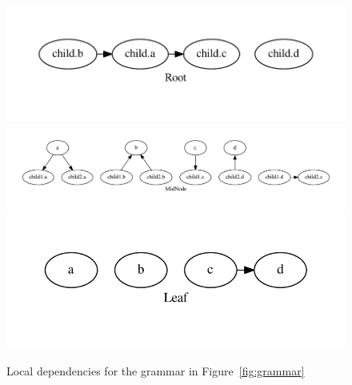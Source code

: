 \documentclass[10pt]{article}
\begin{document}
\begin{figure}[h]
    \begin{center}
        \includegraphics[scale=0.4]{root} \\
        \includegraphics[scale=0.4]{midnode} \\
        \includegraphics[scale=0.4]{leaf} \\
    \end{center}

    \caption{Local dependencies for the grammar in Figure~\ref{fig:grammar}}
    \label{fig:local}
\end{figure}
\end{document}
